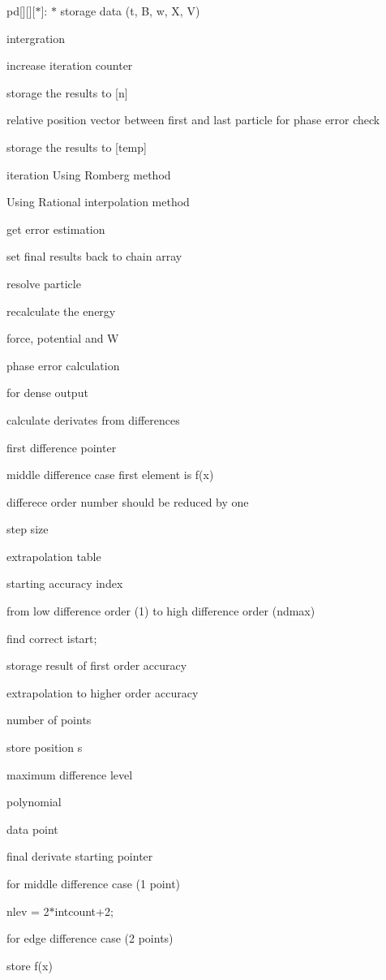 pd\mbox{[}\mbox{]}\mbox{[}\mbox{]}\mbox{[}$\ast$\mbox{]}\+: $\ast$ storage data (t, B, w, X, V)

intergration

increase iteration counter

storage the results to \mbox{[}n\mbox{]}

relative position vector between first and last particle for phase error check

storage the results to \mbox{[}temp\mbox{]}

iteration Using Romberg method

Using Rational interpolation method

get error estimation

set final results back to chain array

resolve particle

recalculate the energy

force, potential and W

phase error calculation

for dense output

calculate derivates from differences

first difference pointer

middle difference case first element is f(x)

differece order number should be reduced by one

step size

extrapolation table

starting accuracy index

from low difference order (1) to high difference order (ndmax)

find correct istart;

storage result of first order accuracy

extrapolation to higher order accuracy

number of points

store position s

maximum difference level

polynomial

data point

final derivate starting pointer

for middle difference case (1 point)

nlev = 2$\ast$intcount+2;

for edge difference case (2 points)

store f(x)

